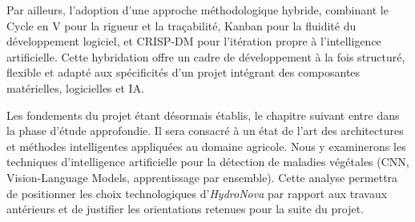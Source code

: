 Par ailleurs, l’adoption d’une approche méthodologique hybride, combinant le Cycle en V pour la rigueur et la traçabilité, Kanban pour la fluidité du développement logiciel, et CRISP‑DM pour l’itération propre à l’intelligence artificielle. Cette hybridation offre un cadre de développement à la fois structuré, flexible et adapté aux spécificités d’un projet intégrant des composantes matérielles, logicielles et IA.

Les fondements du projet étant désormais établis, le chapitre suivant entre dans la phase d’étude approfondie. Il sera consacré à un état de l’art des architectures et méthodes intelligentes appliquées au domaine agricole. Nous y examinerons les techniques d’intelligence artificielle pour la détection de maladies végétales (CNN, Vision-Language Models, apprentissage par ensemble). Cette analyse permettra de positionner les choix technologiques d’\textit{HydroNova} par rapport aux travaux antérieurs et de justifier les orientations retenues pour la suite du projet.
